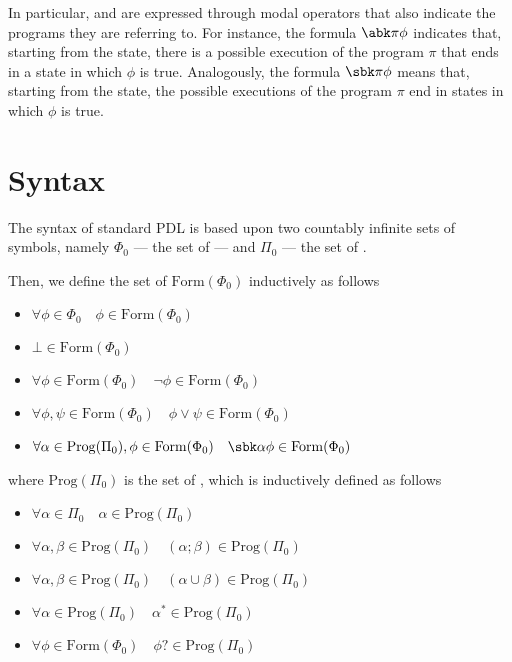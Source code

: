 \documentclass[a4paper, 12pt]{report}
\begin{document}
    In particular,  and  are expressed through modal operators that also indicate the programs they are referring to. For instance, the formula $\abk \pi \phi$ indicates that, starting from the  state, there is a possible execution of the program $\pi$ that ends in a state in which $\phi$ is true. Analogously, the formula $\sbk \pi \phi$ means that, starting from the  state,  the possible executions of the program $\pi$ end in states in which $\phi$ is true.

    \section{Syntax}

    The syntax of standard PDL is based upon two countably infinite sets of symbols, namely $\Phi_0$ --- the set of  --- and $\Pi_0$ --- the set of .

    Then, we define the set of  $\mathrm{Form}(\Phi_0)$ inductively as follows

    \begin{itemize}
        \item $\forall \phi \in \Phi_0 \quad \phi \in \mathrm{Form}(\Phi_0)$
        \item $\bot \in \mathrm{Form}(\Phi_0)$
        \item $\forall \phi \in \mathrm{Form}(\Phi_0) \quad \lnot \phi \in \mathrm{Form}(\Phi_0)$
        \item $\forall \phi, \psi \in \mathrm{Form}(\Phi_0) \quad \phi \lor \psi \in \mathrm{Form}(\Phi_0)$
        \item $\forall \alpha \in \mathrm{Prog}(\Pi_0), \phi \in \mathrm{Form}(\Phi_0) \quad \sbk \alpha \phi \in \mathrm{Form}(\Phi_0)$
    \end{itemize}

    where $\mathrm{Prog}(\Pi_0)$ is the set of , which is inductively defined as follows
    
    \begin{itemize}
        \item $\forall \alpha \in \Pi_0 \quad \alpha \in \mathrm{Prog}(\Pi_0)$
        \item $\forall \alpha, \beta \in \mathrm{Prog}(\Pi_0) \quad (\alpha ; \beta) \in \mathrm{Prog}(\Pi_0)$
        \item $\forall \alpha, \beta \in \mathrm{Prog}(\Pi_0) \quad (\alpha \cup \beta) \in \mathrm{Prog}(\Pi_0)$
        \item $\forall \alpha \in \mathrm{Prog}(\Pi_0) \quad \alpha^* \in \mathrm{Prog}(\Pi_0)$
        \item $\forall \phi \in \mathrm{Form}(\Phi_0) \quad \phi? \in \mathrm{Prog}(\Pi_0)$
    \end{itemize}
\end{document}

